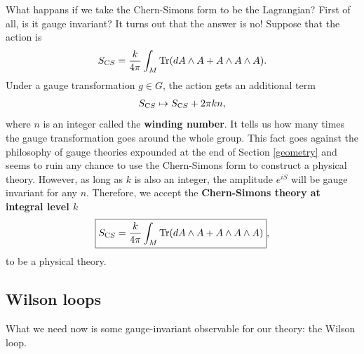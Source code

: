 \documentclass[aps,nofootinbib]{revtex4}
\newcommand\Tr{\mathrm{Tr}}
\begin{document}
What happans if we take the Chern-Simons form to be the Lagrangian? First of all, is it gauge invariant? It turns out that the answer is no! \cite{Pachos12} Suppose that the action is
\begin{align*}
S_{\text CS} = \frac{k}{4\pi} \int_M \Tr (dA \wedge A + A \wedge A \wedge A).
\end{align*}
Under a gauge transformation $g \in G$, the action gets an additional term
\begin{align}
S_{\text CS} \mapsto S_{\text CS} + 2\pi k n,
\end{align}
where $n$ is an integer called the {\bf winding number}. It tells us how many times the gauge transformation goes around the whole group. This fact goes against the philosophy of gauge theories expounded at the end of Section \ref{geometry} and seems to ruin any chance to use the Chern-Simons form to construct a physical theory. However, as long as $k$ is also an integer, the amplitude $e^{iS}$ will be gauge invariant for any $n$. Therefore, we accept the {\bf Chern-Simons theory at integral level $k$}
\begin{align}
\boxed{S_{\text CS} = \frac{k}{4\pi} \int_M \Tr (dA \wedge A + A \wedge A \wedge A)},
\end{align}
to be a physical theory.

\subsection{Wilson loops}\label{Wilson}

What we need now is some gauge-invariant observable for our theory: the Wilson loop. 
\end{document}
